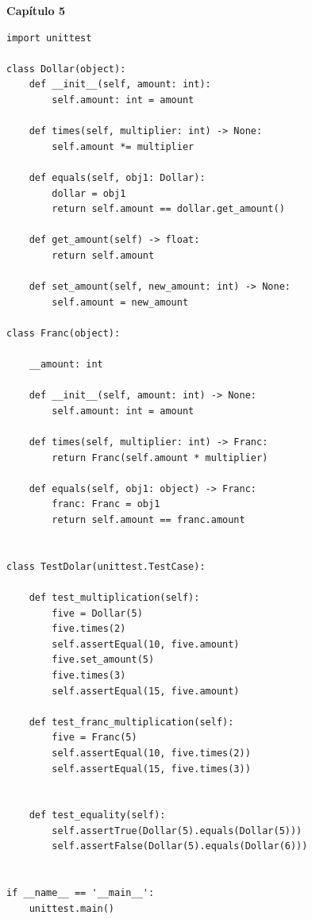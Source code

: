 \documentclass[a4paper,12pt]{article}
\newcommand{\capitulo}[1]{
    \vspace{1em}
    \noindent
    \colorbox{black!15}{
        \parbox{\dimexpr\linewidth-2\fboxsep}{
            \centering \Large \textbf{#1}
        }
    }
    \vspace{1em}
}
\begin{document}
\capitulo{Capítulo 5}
\begin{lstlisting}[style=pythonstyle]
import unittest

class Dollar(object):
    def __init__(self, amount: int):
        self.amount: int = amount

    def times(self, multiplier: int) -> None:
        self.amount *= multiplier

    def equals(self, obj1: Dollar):
        dollar = obj1
        return self.amount == dollar.get_amount()

    def get_amount(self) -> float:
        return self.amount

    def set_amount(self, new_amount: int) -> None:
        self.amount = new_amount

class Franc(object):

    __amount: int

    def __init__(self, amount: int) -> None:
        self.amount: int = amount

    def times(self, multiplier: int) -> Franc:
        return Franc(self.amount * multiplier)

    def equals(self, obj1: object) -> Franc:
        franc: Franc = obj1 
        return self.amount == franc.amount


class TestDolar(unittest.TestCase):

    def test_multiplication(self):
        five = Dollar(5)
        five.times(2) 
        self.assertEqual(10, five.amount)
        five.set_amount(5)
        five.times(3) 
        self.assertEqual(15, five.amount)

    def test_franc_multiplication(self):
        five = Franc(5)
        self.assertEqual(10, five.times(2))
        self.assertEqual(15, five.times(3))


    def test_equality(self):
        self.assertTrue(Dollar(5).equals(Dollar(5)))
        self.assertFalse(Dollar(5).equals(Dollar(6)))


if __name__ == '__main__':
    unittest.main()
\end{lstlisting}
\end{document}
